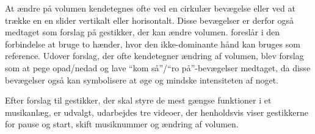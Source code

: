 At ændre på volumen kendetegnes ofte ved en cirkulær bevægelse eller ved at trække en en slider vertikalt eller horisontalt. Disse bevægelser er derfor også medtaget som forslag på gestikker, der kan ændre volumen. \textcite[s. 48]{PDF:UserDefinedGesturesTV} foreslår i den forbindelse at bruge to hænder, hvor den ikke-dominante hånd kan bruges som reference. Udover forslag, der ofte kendetegner ændring af volumen, blev forslag som at pege opad/nedad og lave \enquote{kom så}/\enquote{ro på}-bevægelser medtaget, da disse bevægelser også kan symbolisere at øge og mindske intensiteten af noget. \blankline
%

Efter forslag til gestikker, der skal styre de mest gængse funktioner i et musikanlæg, er udvalgt, udarbejdes tre videoer, der henholdsvis viser gestikkerne for pause og start, skift musiknummer og ændring af volumen. 

